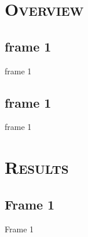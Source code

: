 \documentclass[xcolor=x11names,compress]{beamer}
\renewcommand{\(}{\begin{columns}}
\renewcommand{\)}{\end{columns}}
\newcommand{\<}[1]{\begin{column}{#1}}
\renewcommand{\>}{\end{column}}
\begin{document}
\section{\scshape Overview}
\subsection{frame 1}
\begin{frame}{frame 1}

\end{frame}


\subsection{frame 1}
\begin{frame}{frame 1}

\end{frame}

\section{\scshape Results}
\subsection{Frame 1}
\begin{frame}{Frame 1}

\end{frame}
\end{document}
